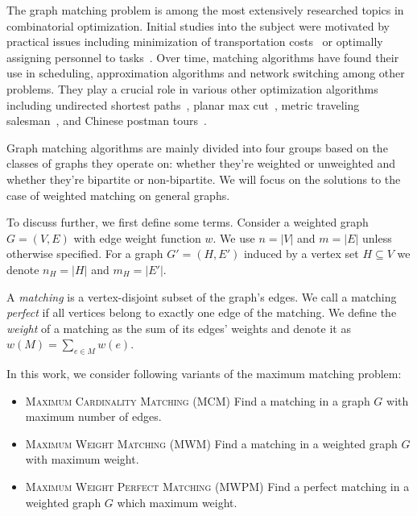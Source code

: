 The graph matching problem is among the most extensively researched topics in combinatorial optimization. Initial studies into the subject were motivated by practical issues including minimization of transportation costs~\cite{hitchcock1941distribution} or optimally assigning personnel to tasks~\cite{thorndike1950problem}. Over time, matching algorithms have found their use in scheduling, approximation algorithms and network switching among other problems. They play a crucial role in various other optimization algorithms including undirected shortest paths~\cite{lawler2001combinatorial}, planar max cut~\cite{hadlock1975finding}, metric traveling salesman~\cite{christofides2022worst}, and Chinese postman tours~\cite{edmonds1973matching}.

Graph matching algorithms are mainly divided into four groups based on the classes of graphs they operate on: whether they're weighted or unweighted and whether they're bipartite or non-bipartite. We will focus on the solutions to the case of weighted matching on general graphs.

To discuss further, we first define some terms. Consider a weighted graph $G = (V, E)$ with edge weight function $w$. We use $n = |V|$ and $m = |E|$ unless otherwise specified. For a graph $G'=(H, E')$ induced by a vertex set $H \subseteq V$ we denote $n_H = |H|$ and $m_H = |E'|$.

A \textit{matching} is a vertex-disjoint subset of the graph's edges. We call a matching \textit{perfect} if all vertices belong to exactly one edge of the matching. We define the \textit{weight} of a matching as the sum of its edges' weights and denote it as $w(M) = \sum_{e \in M} w(e)$.

In this work, we consider following variants of the maximum matching problem:

\begin{itemize}
    \item \textsc{Maximum Cardinality Matching} (\textsc{MCM}) Find a matching in a graph $G$ with maximum number of edges.
    \item \textsc{Maximum Weight Matching} (\textsc{MWM}) Find a matching in a weighted graph $G$ with maximum weight.
    \item \textsc{Maximum Weight Perfect Matching} (\textsc{MWPM}) Find a perfect matching in a weighted graph $G$ which maximum weight.
\end{itemize}

